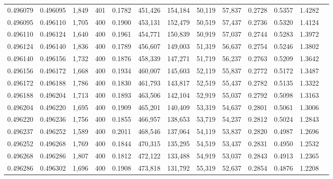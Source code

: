 \begin{tabular}{rrrrrrrrrrrrr}
0.496079 & 0.496095 &  1,849 & 401 &                                     0.1782 & 451,426 & 154,184 &  50,119 &  57,837 & 0.2728 & 0.5357 & 1.4282 \\
0.496095 & 0.496110 &  1,705 & 400 &                                     0.1900 & 453,131 & 152,479 &  50,519 &  57,437 & 0.2736 & 0.5320 & 1.4124 \\
0.496110 & 0.496124 &  1,640 & 400 &                                     0.1961 & 454,771 & 150,839 &  50,919 &  57,037 & 0.2744 & 0.5283 & 1.3972 \\
0.496124 & 0.496140 &  1,836 & 400 &                                     0.1789 & 456,607 & 149,003 &  51,319 &  56,637 & 0.2754 & 0.5246 & 1.3802 \\
0.496140 & 0.496156 &  1,732 & 400 &                                     0.1876 & 458,339 & 147,271 &  51,719 &  56,237 & 0.2763 & 0.5209 & 1.3642 \\
0.496156 & 0.496172 &  1,668 & 400 &                                     0.1934 & 460,007 & 145,603 &  52,119 &  55,837 & 0.2772 & 0.5172 & 1.3487 \\
0.496172 & 0.496188 &  1,786 & 400 &                                     0.1830 & 461,793 & 143,817 &  52,519 &  55,437 & 0.2782 & 0.5135 & 1.3322 \\
0.496188 & 0.496204 &  1,713 & 400 &                                     0.1893 & 463,506 & 142,104 &  52,919 &  55,037 & 0.2792 & 0.5098 & 1.3163 \\
0.496204 & 0.496220 &  1,695 & 400 &                                     0.1909 & 465,201 & 140,409 &  53,319 &  54,637 & 0.2801 & 0.5061 & 1.3006 \\
0.496220 & 0.496236 &  1,756 & 400 &                                     0.1855 & 466,957 & 138,653 &  53,719 &  54,237 & 0.2812 & 0.5024 & 1.2843 \\
0.496237 & 0.496252 &  1,589 & 400 &                                     0.2011 & 468,546 & 137,064 &  54,119 &  53,837 & 0.2820 & 0.4987 & 1.2696 \\
0.496252 & 0.496268 &  1,769 & 400 &                                     0.1844 & 470,315 & 135,295 &  54,519 &  53,437 & 0.2831 & 0.4950 & 1.2532 \\
0.496268 & 0.496286 &  1,807 & 400 &                                     0.1812 & 472,122 & 133,488 &  54,919 &  53,037 & 0.2843 & 0.4913 & 1.2365 \\
0.496286 & 0.496302 &  1,696 & 400 &                                     0.1908 & 473,818 & 131,792 &  55,319 &  52,637 & 0.2854 & 0.4876 & 1.2208 \\

\end{tabular}
